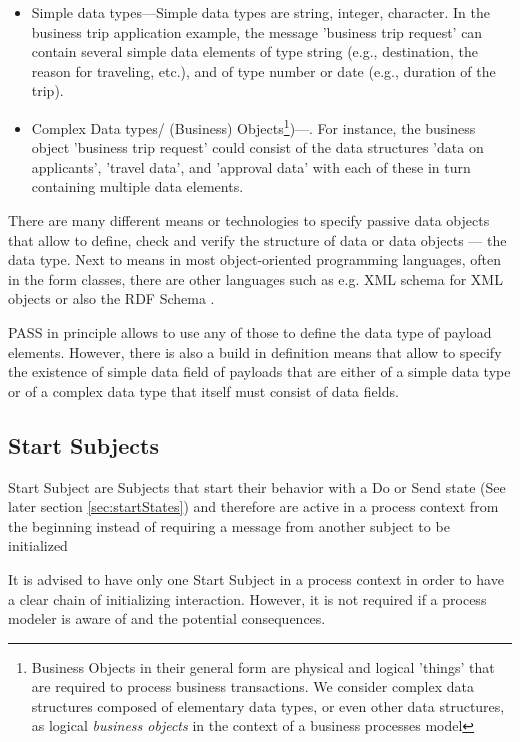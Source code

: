 \begin{itemize}
	\item Simple data types---Simple data types are string, integer, character. In the business trip application example, the message 'business trip request' can contain several simple data elements of type string (e.g., destination, the reason for traveling, etc.), and of type number or date (e.g., duration of the trip).
	\item Complex Data types/ (Business) Objects\footnote{Business Objects in their general form are physical and logical 'things' that are required to process business transactions. We consider complex data structures composed of elementary data types, or even other data structures, as logical \textit{business objects} in the context of a business processes model})---. For instance, the business object 'business trip request' could consist of the data structures 'data on applicants', 'travel data', and 'approval data' with each of these in turn containing multiple data elements.
\end{itemize}

There are many different means or technologies to specify passive data objects that allow to define, check and verify the structure of data or data objects --- the data type. Next to means in most object-oriented programming languages, often in the form classes, there are other languages such as e.g. XML schema\cite{w3d:xmlShema} for XML objects or also the RDF Schema \cite{rdf:rdfs}.

PASS in principle allows to use any of those to define the data type of payload elements. However, there is also a  build in definition means that allow to specify the existence of simple data field of payloads that are either of a simple data type or of a complex data type that itself must consist of data fields.

\subsection{Start Subjects}
\label{sec:startSubject}

Start Subject are Subjects that start their behavior with a Do or Send state (See later section \ref{sec:startStates}) and therefore are active in a process context from the beginning instead of requiring a message from another subject to be initialized 

It is advised to have only one Start Subject in a process context in order to have a clear chain of initializing interaction. However, it is not required if a process modeler is aware of and the potential consequences.


